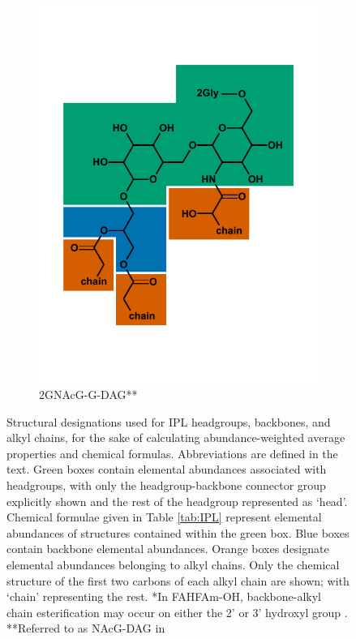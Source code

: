 {\begin{figure}[h]
\begin{subfigure}[b]{.3\linewidth}
        \includegraphics[width=\linewidth]{figs_ch1/2GNAcG-G-DAG}
    	\caption{2GNAcG-G-DAG**}
        \label{fig:2GNAcG-G-DAG}
    \end{subfigure}

    
\caption[Structural designations used for IPL headgroups, backbones, and alkyl chains]{Structural designations used for IPL headgroups, backbones, and alkyl chains, for the sake of calculating abundance-weighted average properties and chemical formulas. Abbreviations are defined in the text. Green boxes contain elemental abundances associated with headgroups, with only the headgroup-backbone connector group explicitly shown and the rest of the headgroup represented as `head'. Chemical formulae given in Table \ref{tab:IPL} represent elemental abundances of structures contained within the green box. Blue boxes contain backbone elemental abundances. Orange boxes designate elemental abundances belonging to alkyl chains. Only the chemical structure of the first two carbons of each alkyl chain are shown; with `chain' representing the rest. *In FAHFAm-OH, backbone-alkyl chain esterification may occur on either the 2' or 3' hydroxyl group \citep{diercks2015accumulation}. **Referred to as NAcG-DAG in \cite{schubotz2013spatial}}
\label{fig:IPLdivision}
\end{figure}
\doublespace
\clearpage
}


